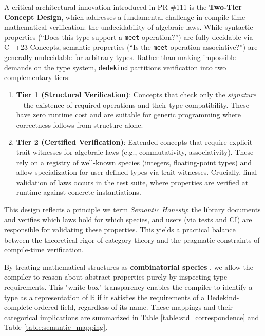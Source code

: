 \documentclass[11pt, a4paper]{report}
\begin{document}
A critical architectural innovation introduced in PR \#111 is the \textbf{Two-Tier Concept Design}, which addresses a fundamental challenge in compile-time mathematical verification: the undecidability of algebraic laws. While syntactic properties (``Does this type support a \texttt{meet} operation?'') are fully decidable via C++23 Concepts, semantic properties (``Is the \texttt{meet} operation associative?'') are generally undecidable for arbitrary types. Rather than making impossible demands on the type system, \texttt{dedekind} partitions verification into two complementary tiers:

\begin{enumerate}
\item \textbf{Tier 1 (Structural Verification)}: Concepts that check only the \emph{signature}—the existence of required operations and their type compatibility. These have zero runtime cost and are suitable for generic programming where correctness follows from structure alone.

\item \textbf{Tier 2 (Certified Verification)}: Extended concepts that require explicit trait witnesses for algebraic laws (e.g., commutativity, associativity). These rely on a registry of well-known species (integers, floating-point types) and allow specialization for user-defined types via trait witnesses. Crucially, final validation of laws occurs in the test suite, where properties are verified at runtime against concrete instantiations.
\end{enumerate}

This design reflects a principle we term \textit{Semantic Honesty}: the library documents and verifies which laws hold for which species, and users (via tests and CI) are responsible for validating these properties. This yields a practical balance between the theoretical rigor of category theory and the pragmatic constraints of compile-time verification.

By treating mathematical structures as \textbf{combinatorial species} \cite{joyal1981species}, we allow the compiler to reason about abstract properties purely by inspecting type requirements.
This "white-box" transparency enables the compiler to identify a type as a representation of $\mathbb{R}$ if it satisfies the requirements of a Dedekind-complete ordered field, regardless of its name.
These mappings and their categorical implications are summarized in Table \ref{table:std_correspondence} and Table \ref{table:semantic_mapping}.
\end{document}
